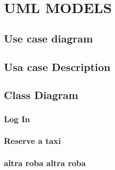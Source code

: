

\section{UML MODELS}
\subsection{Use case diagram}
\subsection{Usa case Description}
\subsection{Class Diagram}
\subsubsection{Log In}
\subsubsection{Reserve a taxi}
\subsubsection{altra roba altra roba}
